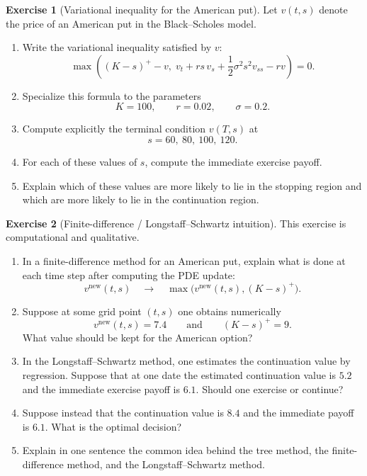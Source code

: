 \documentclass[11pt]{article}
\newcommand{\1}{\mathbf{1}}
\theoremstyle{definition}
\newtheorem{exercise}{Exercise}[section]
\begin{document}

\begin{exercise}[Variational inequality for the American put]
Let \(v(t,s)\) denote the price of an American put in the Black--Scholes model.

\begin{enumerate}[leftmargin=1.6em]
\item Write the variational inequality satisfied by \(v\):
\[
\max\!\left((K-s)^+-v,\; v_t + rs\,v_s + \frac12 \sigma^2 s^2 v_{ss} - rv\right)=0.
\]

\item Specialize this formula to the parameters
\[
K=100,\qquad r=0.02,\qquad \sigma=0.2.
\]

\item Compute explicitly the terminal condition \(v(T,s)\) at
\[
s=60,\ 80,\ 100,\ 120.
\]

\item For each of these values of \(s\), compute the immediate exercise payoff.

\item Explain which of these values are more likely to lie in the stopping region and which are more likely to lie in the continuation region.
\end{enumerate}
\end{exercise}


\begin{exercise}[Finite-difference / Longstaff--Schwartz intuition]
This exercise is computational and qualitative.

\begin{enumerate}[leftmargin=1.6em]
\item In a finite-difference method for an American put, explain what is done at each time step after computing the PDE update:
\[
v^{\text{new}}(t,s)
\quad \longrightarrow \quad
\max\big(v^{\text{new}}(t,s),(K-s)^+\big).
\]

\item Suppose at some grid point \((t,s)\) one obtains numerically
\[
v^{\text{new}}(t,s)=7.4
\qquad\text{and}\qquad
(K-s)^+=9.
\]
What value should be kept for the American option?

\item In the Longstaff--Schwartz method, one estimates the continuation value by regression.
Suppose that at one date the estimated continuation value is \(5.2\) and the immediate exercise payoff is \(6.1\).
Should one exercise or continue?

\item Suppose instead that the continuation value is \(8.4\) and the immediate payoff is \(6.1\).
What is the optimal decision?

\item Explain in one sentence the common idea behind the tree method, the finite-difference method, and the Longstaff--Schwartz method.
\end{enumerate}
\end{exercise}
\end{document}
